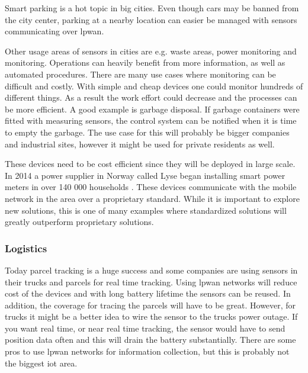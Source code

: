 \documentclass[USenglish]{ifimaster}  %
\begin{document}
Smart parking is a hot topic in big cities. Even though cars may be banned from the city center, parking at a nearby location can easier be managed with sensors communicating over \acrshort{lpwan}.


Other usage areas of sensors in cities are e.g. waste areas, power monitoring and  monitoring. Operations can heavily benefit from more information, as well as automated procedures. There are many use cases where monitoring can be difficult and costly. With simple and cheap devices one could monitor hundreds of different things. As a result the work effort could decrease and the processes can be more efficient. A good example is garbage disposal. If garbage containers were fitted with measuring sensors, the control system can be notified when it is time to empty the garbage. The use case for this will probably be bigger companies and industrial sites, however it might be used for private residents as well.

These devices need to be cost efficient since they will be deployed in large scale. In 2014 a power supplier in Norway called Lyse began installing smart power meters in over 140 000 households \cite{online:lyseAMS}. These devices communicate with the mobile network in the area over a proprietary standard. While it is important to explore new solutions, this is one of many examples where standardized solutions will greatly outperform proprietary solutions.

\subsubsection{Logistics}
Today parcel tracking is a huge success and some companies are using sensors in their trucks and parcels for real time tracking. Using \acrshort{lpwan} networks will reduce cost of the devices and with long battery lifetime the sensors can be reused. In addition, the coverage for tracing the parcels will have to be great. However, for trucks it might be a better idea to wire the sensor to the trucks power outage. If you want real time, or near real time tracking, the sensor would have to send position data often and this will drain the battery substantially. There are some pros to use \acrshort{lpwan} networks for information collection, but this is probably not the biggest \acrshort{iot} area.
\end{document}
